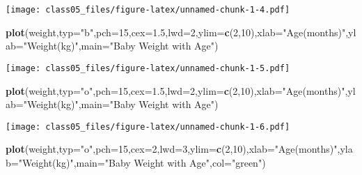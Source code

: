 \documentclass[]{article}
\newenvironment{Shaded}{\begin{snugshade}}{\end{snugshade}}
\newcommand{\KeywordTok}[1]{\textcolor[rgb]{0.13,0.29,0.53}{\textbf{#1}}}
\newcommand{\DataTypeTok}[1]{\textcolor[rgb]{0.13,0.29,0.53}{#1}}
\newcommand{\DecValTok}[1]{\textcolor[rgb]{0.00,0.00,0.81}{#1}}
\newcommand{\FloatTok}[1]{\textcolor[rgb]{0.00,0.00,0.81}{#1}}
\newcommand{\StringTok}[1]{\textcolor[rgb]{0.31,0.60,0.02}{#1}}
\newcommand{\NormalTok}[1]{#1}
\begin{document}
\texttt{[image: class05\_files/figure-latex/unnamed-chunk-1-4.pdf]}

\begin{Shaded}
\begin{Highlighting}[]
\KeywordTok{plot}\NormalTok{(weight,}\DataTypeTok{typ=}\StringTok{"b"}\NormalTok{,}\DataTypeTok{pch=}\DecValTok{15}\NormalTok{,}\DataTypeTok{cex=}\FloatTok{1.5}\NormalTok{,}\DataTypeTok{lwd=}\DecValTok{2}\NormalTok{,}\DataTypeTok{ylim=}\KeywordTok{c}\NormalTok{(}\DecValTok{2}\NormalTok{,}\DecValTok{10}\NormalTok{),}\DataTypeTok{xlab=}\StringTok{"Age(months)"}\NormalTok{,}\DataTypeTok{ylab=}\StringTok{"Weight(kg)"}\NormalTok{,}\DataTypeTok{main=}\StringTok{"Baby Weight with Age"}\NormalTok{)}
\end{Highlighting}
\end{Shaded}

\texttt{[image: class05\_files/figure-latex/unnamed-chunk-1-5.pdf]}

\begin{Shaded}
\begin{Highlighting}[]
\KeywordTok{plot}\NormalTok{(weight,}\DataTypeTok{typ=}\StringTok{"o"}\NormalTok{,}\DataTypeTok{pch=}\DecValTok{15}\NormalTok{,}\DataTypeTok{cex=}\FloatTok{1.5}\NormalTok{,}\DataTypeTok{lwd=}\DecValTok{2}\NormalTok{,}\DataTypeTok{ylim=}\KeywordTok{c}\NormalTok{(}\DecValTok{2}\NormalTok{,}\DecValTok{10}\NormalTok{),}\DataTypeTok{xlab=}\StringTok{"Age(months)"}\NormalTok{,}\DataTypeTok{ylab=}\StringTok{"Weight(kg)"}\NormalTok{,}\DataTypeTok{main=}\StringTok{"Baby Weight with Age"}\NormalTok{)}
\end{Highlighting}
\end{Shaded}

\texttt{[image: class05\_files/figure-latex/unnamed-chunk-1-6.pdf]}

\begin{Shaded}
\begin{Highlighting}[]
\KeywordTok{plot}\NormalTok{(weight,}\DataTypeTok{typ=}\StringTok{"o"}\NormalTok{,}\DataTypeTok{pch=}\DecValTok{15}\NormalTok{,}\DataTypeTok{cex=}\DecValTok{2}\NormalTok{,}\DataTypeTok{lwd=}\DecValTok{3}\NormalTok{,}\DataTypeTok{ylim=}\KeywordTok{c}\NormalTok{(}\DecValTok{2}\NormalTok{,}\DecValTok{10}\NormalTok{),}\DataTypeTok{xlab=}\StringTok{"Age(months)"}\NormalTok{,}\DataTypeTok{ylab=}\StringTok{"Weight(kg)"}\NormalTok{,}\DataTypeTok{main=}\StringTok{"Baby Weight with Age"}\NormalTok{,}\DataTypeTok{col=}\StringTok{"green"}\NormalTok{)}
\end{Highlighting}
\end{Shaded}
\end{document}

